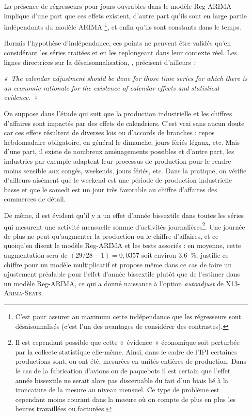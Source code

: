 \documentclass[12pt, a4paper, french]{article}
\begin{document}
La présence de régresseurs pour jours ouvrables dans le modèle Reg-ARIMA implique d'une part que ces effets existent, d'autre part qu'ils sont en large partie indépendants du modèle ARIMA \footnote{C'est pour assurer au maximum cette indépendance que les régresseurs sont désaisonnalisés (c'est l'un des avantages de considérer des contrastes).}, et enfin qu'ils sont constants dans le temps.

Hormis l'hypothèse d'indépendance, ces points ne peuvent être validés qu'en considérant les séries traitées et en les replongeant dans leur contexte réel. Les lignes directrices sur la désaisonnalisation, \cite{E2015}, précisent d'ailleurs :

{\it «~The calendar adjustment should be done for those time series for which there is an economic rationale for the existence of calendar effects and statistical evidence.~»}

On suppose dans l'étude qui suit que la production industrielle et les chiffres d'affaires sont impactés par des effets de calendriers. C’est vrai sans aucun doute car ces effets résultent de diverses lois ou d'accords de branches : repos hebdomadaire obligatoire, en général le dimanche, jours fériés légaux, etc. Mais d'une part, il existe de nombreux aménagements possibles et d'autre part, les industries par exemple adaptent leur processus de production pour le rendre moins sensible aux congés, weekends, jours fériés, etc. Dans la pratique, on vérifie d'ailleurs aisément que le weekend est une période de production industrielle basse et que le samedi est un jour très favorable au chiffre d'affaires des commerces de détail.

De même, il est évident qu'il y a un effet d'année bissextile dans toutes les séries qui mesurent une activité mensuelle somme d'activités journalières\footnote{Il est cependant possible que cette «~évidence~» économique soit perturbée par la collecte statistique elle-même. Ainsi, dans le cadre de l'IPI certaines productions sont, ou ont été, mesurées en unités entières de production. Dans le cas de la fabrication d'avions ou de paquebots il est certain que l'effet année bissextile ne serait alors pas discernable du fait d'un biais lié à la troncature de la mesure au niveau mensuel. Ce type de problème est cependant moins courant dans la mesure où on compte de plus en plus les heures travaillées ou facturées.}. Une journée de plus ne peut qu'augmenter la production ou le chiffre d'affaires, et ce quoiqu'en disent le modèle Reg-ARIMA et les tests associés : en moyenne, cette augmentation sera de $(29/28 - 1) = 0,0357$ soit environ 3,6~\%. \cite{B1992} justifie ce chiffre pour un modèle multiplicatif et propose même dans ce cas de faire un ajustement préalable pour l'effet d'année bissextile plutôt que de l'estimer dans un modèle Reg-ARIMA, ce qui a donné naissance à l'option \emph{autoadjust} de \textsc{X13-Arima-Seats}.
\end{document}
